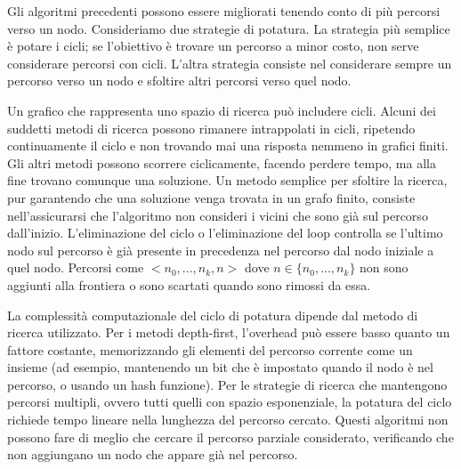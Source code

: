 \documentclass[a4paper]{extarticle}
\begin{document}
Gli algoritmi precedenti possono essere migliorati tenendo conto di più percorsi verso un nodo. Consideriamo due strategie di potatura. La strategia più semplice è potare i cicli; se l'obiettivo è trovare un percorso a minor costo, non serve considerare percorsi con cicli. L'altra strategia consiste nel considerare sempre un percorso verso un nodo e sfoltire altri percorsi verso quel nodo.

Un grafico che rappresenta uno spazio di ricerca può includere cicli. Alcuni dei suddetti metodi di ricerca possono rimanere intrappolati in cicli, ripetendo continuamente il ciclo e non trovando mai una risposta nemmeno in grafici finiti. Gli altri metodi possono scorrere ciclicamente, facendo perdere tempo, ma alla fine trovano comunque una soluzione. Un metodo semplice per sfoltire la ricerca, pur garantendo che una soluzione venga trovata in un grafo finito, consiste nell'assicurarsi che l'algoritmo non consideri i vicini che sono già sul percorso dall'inizio. L'eliminazione del ciclo o l'eliminazione del loop controlla se l'ultimo nodo sul percorso è già presente in precedenza nel percorso dal nodo iniziale a quel nodo. Percorsi come $<n_0,...,n_k,n>$ dove $n\in \{n_0,...,n_k\}$ non sono aggiunti alla frontiera o sono scartati quando sono rimossi da essa.

La complessità computazionale del ciclo di potatura dipende dal metodo di ricerca utilizzato. Per i metodi depth-first, l'overhead può essere basso quanto un fattore costante, memorizzando gli elementi del percorso corrente come un insieme (ad esempio, mantenendo un bit che è impostato quando il nodo è nel percorso, o usando un hash funzione). Per le strategie di ricerca che mantengono percorsi multipli, ovvero tutti quelli con spazio esponenziale, la potatura del ciclo richiede tempo lineare nella lunghezza del percorso cercato. Questi algoritmi non possono fare di meglio che cercare il percorso parziale considerato, verificando che non aggiungano un nodo che appare già nel percorso.
\end{document}

